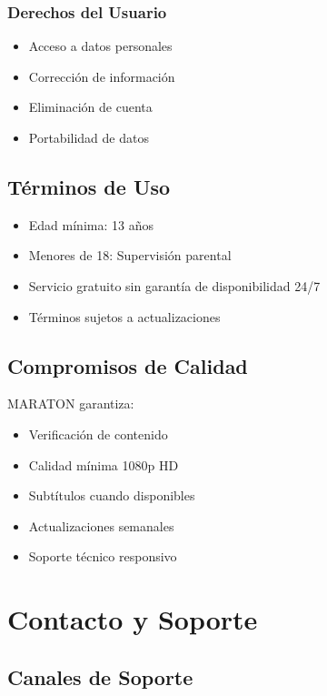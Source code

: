 \documentclass[11pt,a4paper,twoside]{book}
\begin{document}
\subsection{Derechos del Usuario}
\begin{itemize}
    \item Acceso a datos personales
    \item Corrección de información
    \item Eliminación de cuenta
    \item Portabilidad de datos
\end{itemize}

\section{Términos de Uso}

\begin{itemize}
    \item Edad mínima: 13 años
    \item Menores de 18: Supervisión parental
    \item Servicio gratuito sin garantía de disponibilidad 24/7
    \item Términos sujetos a actualizaciones
\end{itemize}

\section{Compromisos de Calidad}

MARATON garantiza:
\begin{itemize}
    \item Verificación de contenido
    \item Calidad mínima 1080p HD
    \item Subtítulos cuando disponibles
    \item Actualizaciones semanales
    \item Soporte técnico responsivo
\end{itemize}

\chapter{Contacto y Soporte}

\section{Canales de Soporte}
\end{document}
